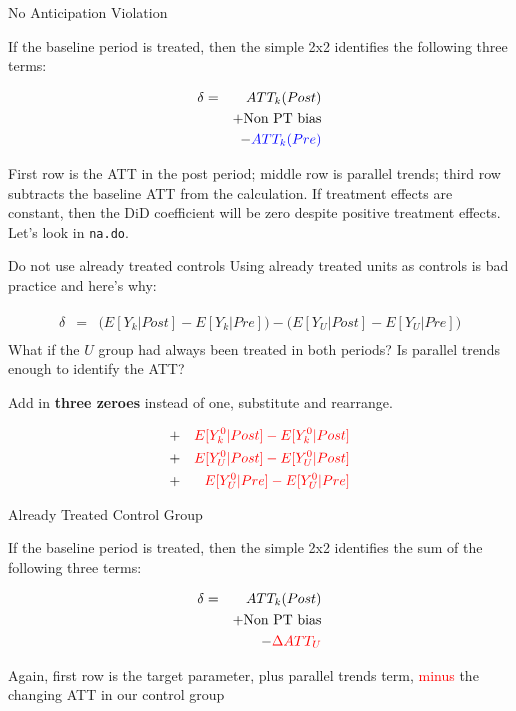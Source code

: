 \documentclass{beamer}
\begin{document}
\begin{frame}{No Anticipation Violation}

If the baseline period is treated, then the simple 2x2 identifies the following three terms:

\begin{eqnarray*}
\delta &=& ATT_k(Post) \\&&+ \text{Non PT bias} \\&&- \textcolor{blue}{ATT_k(Pre)}
\end{eqnarray*}

First row is the ATT in the post period; middle row is parallel trends; third row subtracts the baseline ATT from the calculation. If treatment effects are constant, then the DiD coefficient will be zero despite positive treatment effects.  Let's look in \texttt{na.do}.

\end{frame}

\begin{frame}{Do not use already treated controls}
Using already treated units as controls is bad practice and here's why:

\begin{eqnarray*}
\widehat{\delta} &=& \bigg ( E[Y_k|Post] - E[Y_k|Pre] \bigg ) - \bigg ( E[Y_U | Post ] - E[ Y_U | Pre] \bigg) \\
\end{eqnarray*}What if the $U$ group had always been treated in both periods? Is parallel trends enough to identify the ATT?

\bigskip

Add in \textbf{three zeroes} instead of one, substitute and rearrange.

\begin{eqnarray*}
&+& \textcolor{red}{E[Y^0_k|Post] - E[Y^0_k|Post]} \\
&+& \textcolor{red}{E[Y^0_U|Post] - E[Y^0_U|Post]}  \\
&+& \textcolor{red}{E[Y^0_U|Pre] - E[Y^0_U|Pre]} 
\end{eqnarray*}

\end{frame}

\begin{frame}{Already Treated Control Group}

If the baseline period is treated, then the simple 2x2 identifies the sum of the following three terms:

\begin{eqnarray*}
\delta &=& ATT_k(Post) \\&&+ \text{Non PT bias} \\&&- \textcolor{red}{\Delta ATT_U}
\end{eqnarray*}

Again, first row is the target parameter, plus parallel trends term, \textcolor{red}{minus} the changing ATT in our control group

\end{frame}
\end{document}
